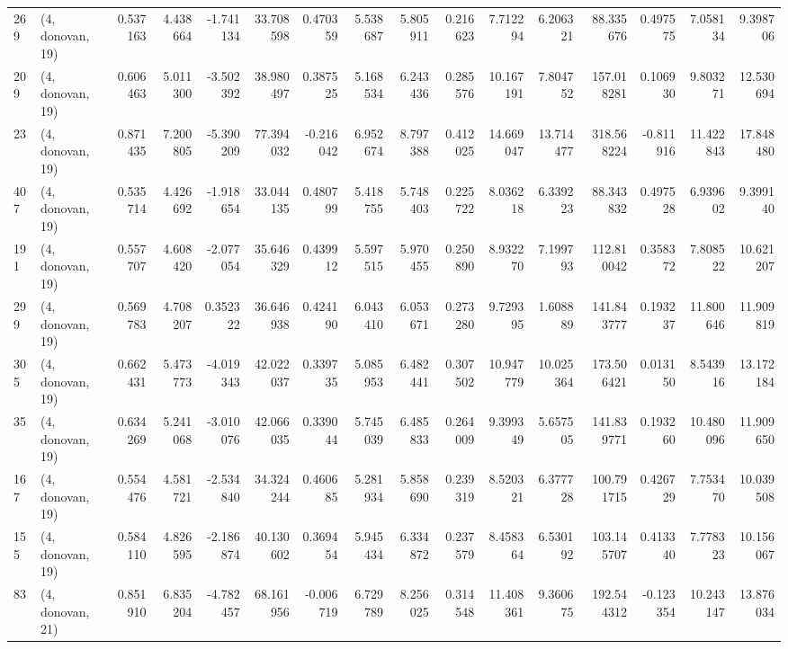 \begin{tabular}{llrrrrrrrrrrrrrr}
269 &  (4, donovan, 19) &   0.537163 &   4.438664 &  -1.741134 &    33.708598 &   0.470359 &   5.538687 &   5.805911 &  0.216623 &   7.712294 &   6.206321 &    88.335676 &  0.497575 &   7.058134 &   9.398706 \\
209 &  (4, donovan, 19) &   0.606463 &   5.011300 &  -3.502392 &    38.980497 &   0.387525 &   5.168534 &   6.243436 &  0.285576 &  10.167191 &   7.804752 &   157.018281 &  0.106930 &   9.803271 &  12.530694 \\
23  &  (4, donovan, 19) &   0.871435 &   7.200805 &  -5.390209 &    77.394032 &  -0.216042 &   6.952674 &   8.797388 &  0.412025 &  14.669047 &  13.714477 &   318.568224 & -0.811916 &  11.422843 &  17.848480 \\
407 &  (4, donovan, 19) &   0.535714 &   4.426692 &  -1.918654 &    33.044135 &   0.480799 &   5.418755 &   5.748403 &  0.225722 &   8.036218 &   6.339223 &    88.343832 &  0.497528 &   6.939602 &   9.399140 \\
191 &  (4, donovan, 19) &   0.557707 &   4.608420 &  -2.077054 &    35.646329 &   0.439912 &   5.597515 &   5.970455 &  0.250890 &   8.932270 &   7.199793 &   112.810042 &  0.358372 &   7.808522 &  10.621207 \\
299 &  (4, donovan, 19) &   0.569783 &   4.708207 &   0.352322 &    36.646938 &   0.424190 &   6.043410 &   6.053671 &  0.273280 &   9.729395 &   1.608889 &   141.843777 &  0.193237 &  11.800646 &  11.909819 \\
305 &  (4, donovan, 19) &   0.662431 &   5.473773 &  -4.019343 &    42.022037 &   0.339735 &   5.085953 &   6.482441 &  0.307502 &  10.947779 &  10.025364 &   173.506421 &  0.013150 &   8.543916 &  13.172184 \\
35  &  (4, donovan, 19) &   0.634269 &   5.241068 &  -3.010076 &    42.066035 &   0.339044 &   5.745039 &   6.485833 &  0.264009 &   9.399349 &   5.657505 &   141.839771 &  0.193260 &  10.480096 &  11.909650 \\
167 &  (4, donovan, 19) &   0.554476 &   4.581721 &  -2.534840 &    34.324244 &   0.460685 &   5.281934 &   5.858690 &  0.239319 &   8.520321 &   6.377728 &   100.791715 &  0.426729 &   7.753470 &  10.039508 \\
155 &  (4, donovan, 19) &   0.584110 &   4.826595 &  -2.186874 &    40.130602 &   0.369454 &   5.945434 &   6.334872 &  0.237579 &   8.458364 &   6.530192 &   103.145707 &  0.413340 &   7.778323 &  10.156067 \\
83  &  (4, donovan, 21) &   0.851910 &   6.835204 &  -4.782457 &    68.161956 &  -0.006719 &   6.729789 &   8.256025 &  0.314548 &  11.408361 &   9.360675 &   192.544312 & -0.123354 &  10.243147 &  13.876034 \\

\end{tabular}
